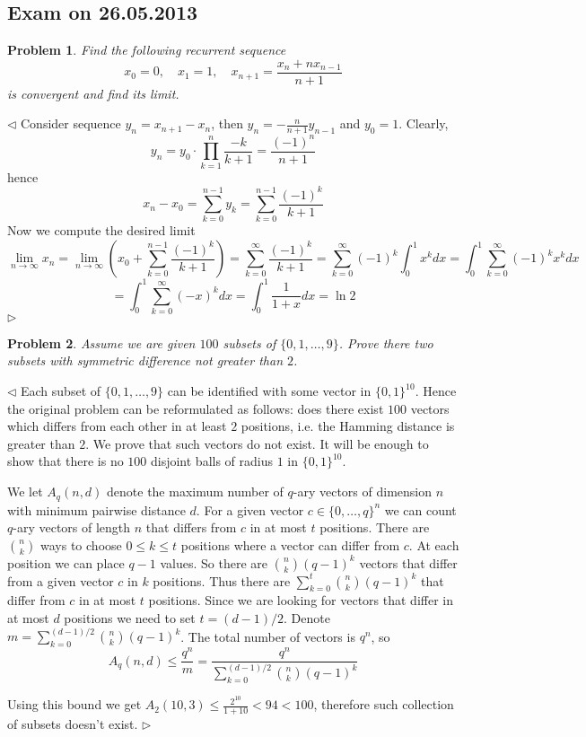 \documentclass[12pt]{article}
\newtheorem{problem}{Problem}[subsection]
\newenvironment{solution}{\par $\triangleleft$}{$\triangleright$}
\begin{document}
 
 
 
\newpage
 
\subsection{Exam on 26.05.2013}
 
\begin{problem} Find the following recurrent sequence
$$
x_0=0,\quad x_1=1,\quad x_{n+1}=\frac{x_n+nx_{n-1}}{n+1}
$$
is convergent and find its limit.
\end{problem}
\begin{solution} Consider sequence $y_n=x_{n+1}-x_n$, then $y_n=-\frac{n}{n+1}y_{n-1}$ and $y_0=1$. Clearly,
$$
y_n=y_0\cdot\prod_{k=1}^n\frac{-k}{k+1}=\frac{(-1)^n}{n+1}
$$
hence
$$
x_n-x_0
=\sum_{k=0}^{n-1} y_k 
=\sum_{k=0}^{n-1} \frac{(-1)^k}{k+1}
$$
Now we compute the desired limit
$$
\lim\limits_{n\to\infty} x_n
=\lim\limits_{n\to\infty}\left(x_0+\sum_{k=0}^{n-1} \frac{(-1)^k}{k+1}\right)
=\sum_{k=0}^\infty\frac{(-1)^k}{k+1}
=\sum_{k=0}^\infty(-1)^k\int_0^1 x^kdx
=\int_0^1\sum_{k=0}^\infty(-1)^k x^kdx
$$
$$
=\int_0^1\sum_{k=0}^\infty(-x)^kdx
=\int_0^1\frac{1}{1+x}dx
=\ln 2
$$
\end{solution}
 
\begin{problem} Assume we are given $100$ subsets of $\{0,1,\ldots,9\}$. Prove there two subsets with symmetric difference not greater than $2$.
\end{problem}
\begin{solution} Each subset of $\{0,1,\dots, 9\}$ can be identified with some vector in $\{0,1\}^{10}$. Hence the original problem can be reformulated as follows: does there exist $100$ vectors which differs from each other in at least $2$ positions, i.e. the Hamming distance is greater than $2$. We prove that such vectors do not exist. It will be enough to show that there is no $100$ disjoint balls of radius $1$ in $\{0, 1\}^{10}$. 
 
 
We let $A_q(n,d)$ denote the maximum number of $q$-ary vectors of dimension $n$ with minimum pairwise distance $d$. For a given vector $c\in\{0,\ldots,q\}^n$ we can count $q$-ary vectors of length $n$ that differs from $c$ in at most $t$ positions. There are $\binom{n}{k}$ ways to choose $0\leq k\leq t$ positions where a vector can differ from $c$. At each position we can place $q-1$ values. So there are $\binom{n}{k}(q-1)^k$ vectors that differ from a given vector $c$ in $k$ positions. Thus there are $\sum_{k=0}^ t\binom{n}{k}(q-1)^k$ that differ from $c$ in at most $t$ positions. Since we are looking for vectors that differ in at most $d$ positions we need to set $t=(d-1)/2$. Denote $m=\sum_{k=0}^{(d-1)/2}\binom{n}{k}(q-1)^k$. The total number of vectors is $q^n$, so
$$
A_q(n,d)\leq\frac{q^n}{m}=\frac{q^n}{\sum_{k=0}^{(d-1)/2}\binom{n}{k}(q-1)^k}
$$
 
Using this bound we get $A_2(10,3) \leq \frac{2^{10}}{1 + 10} < 94<100$, therefore such collection of subsets doesn't exist.
\end{solution}
 
\end{document}
